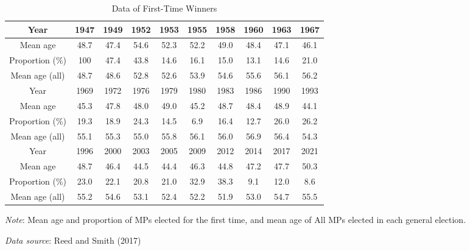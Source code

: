 
\begin{table}[ht]
\begin{threeparttable}
\begin{tabular}{c|ccccccccc}
\toprule
Year & 1947 & 1949 & 1952 & 1953 & 1955 & 1958 & 1960 & 1963 & 1967 \\
\midrule
Mean age & 48.7 & 47.4 & 54.6 & 52.3 & 52.2 & 49.0 & 48.4 & 47.1 & 46.1 \\
Proportion (\%) & 100 & 47.4 & 43.8 & 14.6 & 16.1 & 15.0 & 13.1 & 14.6 & 21.0 \\
Mean age (all) & 48.7 & 48.6 & 52.8 & 52.6 & 53.9 & 54.6 & 55.6 & 56.1 & 56.2 \\
\midrule 
Year & 1969 & 1972 & 1976 & 1979 & 1980 & 1983 & 1986 & 1990 & 1993 \\
\midrule 
Mean age & 45.3 & 47.8 & 48.0 & 49.0 & 45.2 & 48.7 & 48.4 & 48.9 & 44.1 \\
Proportion (\%) & 19.3 & 18.9 & 24.3 & 14.5 & 6.9 & 16.4 & 12.7 & 26.0 & 26.2 \\
Mean age (all) & 55.1 & 55.3 & 55.0 & 55.8 & 56.1 & 56.0 & 56.9 & 56.4 & 54.3 \\
\midrule 
Year & 1996 & 2000 & 2003 & 2005 & 2009 & 2012 & 2014 & 2017 & 2021 \\
\midrule 
Mean age & 48.7 & 46.4 & 44.5 & 44.4 & 46.3 & 44.8 & 47.2 & 47.7 & 50.3 \\
Proportion (\%) & 23.0 & 22.1 & 20.8 & 21.0 & 32.9 & 38.3 & 9.1 & 12.0 & 8.6 \\
Mean age (all) & 55.2 & 54.6 & 53.1 & 52.4 & 52.2 & 51.9 & 53.0 & 54.7 & 55.5 \\
\bottomrule
\end{tabular}
\begin{tablenotes}[flushleft]
  \scriptsize{
    \item \textit{Note}: Mean age and proportion of MPs elected for the first time, and mean age of All MPs elected in each general election. 
    \item \textit{Data source}: Reed and Smith (2017)
  }
\end{tablenotes}
\end{threeparttable}
\caption{Data of First-Time Winners}
\label{tab:firstElection}
\end{table}